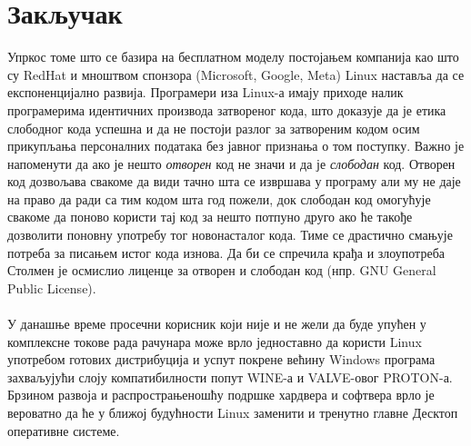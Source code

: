 \documentclass[a4paper,14pt]{article}
\begin{document}
\section*{Закључак}
Упркос томе што се базира на бесплатном моделу постојањем компанија као што су RedHat и мноштвом спонзора (Microsoft, Google, Meta) Linux наставља да се експоненцијално развија. Програмери иза Linux-а имају приходе налик програмерима идентичних производа затвореног кода, што доказује да је етика слободног кода успешна и да не постоји разлог за затвореним кодом осим прикупљања персоналних података без јавног признања о том поступку. Важно је напоменути да ако је нешто \textit{отворен} код не значи и да је \textit{слободан} код. Отворен код дозвољава свакоме да види тачно шта се извршава у програму али му не даје на право да ради са тим кодом шта год пожели, док слободан код омогућује свакоме да поново користи тај код за нешто потпуно друго ако ће такође дозволити поновну употребу тог новонасталог кода. Тиме се драстично смањује потреба за писањем истог кода изнова. Да би се спречила крађа и злоупотреба Столмен је осмислио лиценце за отворен и слободан код (нпр. GNU General Public License\cite{gpl}).
\\\\
У данашње време просечни корисник који није и не жели да буде упућен у комплексне токове рада рачунара може врло једноставно да користи Linux употребом готових дистрибуција и успут покрене већину Windows програма захваљујући слоју компатибилности попут WINE-а\cite{wine} и VALVE-овог\cite{valve} PROTON-а\cite{proton}. Брзином развоја и распрострањеношћу подршке хардвера и софтвера врло је вероватно да ће у ближој будућности Linux заменити и тренутно главне Десктоп оперативне системе.
\newpage

\renewcommand\refname{Литература}


\newpage
\end{document}
